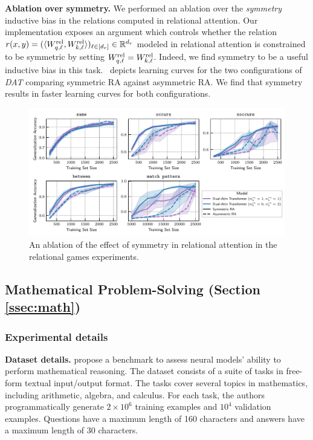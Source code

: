 \textbf{Ablation over symmetry.} We performed an ablation over the \textit{symmetry} inductive bias in the relations computed in relational attention. Our implementation exposes an argument which controls whether the relation $r(x, y) = (\langle W_{q, \ell}^{\mathrm{rel}}, W_{k, \ell}^{\mathrm{rel}} \rangle)_{\ell \in [d_r]} \in \mathbb{R}^{d_r}$ modeled in relational attention is constrained to be symmetric by setting $W_{q, \ell}^{\mathrm{rel}} = W_{k, \ell}^{\mathrm{rel}}$. Indeed, we find symmetry to be a useful inductive bias in this task.~ depicts learning curves for the two configurations of \textit{DAT} comparing symmetric RA against asymmetric RA. We find that symmetry results in faster learning curves for both configurations.

\begin{figure}[h]
    \centering
    \includegraphics[width=\textwidth]{figs/experiments/relgames/relgames_learning_curves_symmetry_ablation.pdf}
    \caption{An ablation of the effect of symmetry in relational attention in the relational games experiments.}\label{fig:relgames_symmetry_ablation}
\end{figure}

\subsection{Mathematical Problem-Solving (Section \ref{ssec:math})}\label{ssec:appendix_math}

\subsubsection*{Experimental details}

\textbf{Dataset details.} \citet{saxtonAnalyzingMathematicalReasoning2019} propose a benchmark to assess neural models' ability to perform mathematical reasoning. The dataset consists of a suite of tasks in free-form textual input/output format. The tasks cover several topics in mathematics, including arithmetic, algebra, and calculus. For each task, the authors programmatically generate $2 \times 10^6$ training examples and $10^4$ validation examples. Questions have a maximum length of 160 characters and answers have a maximum length of 30 characters.

